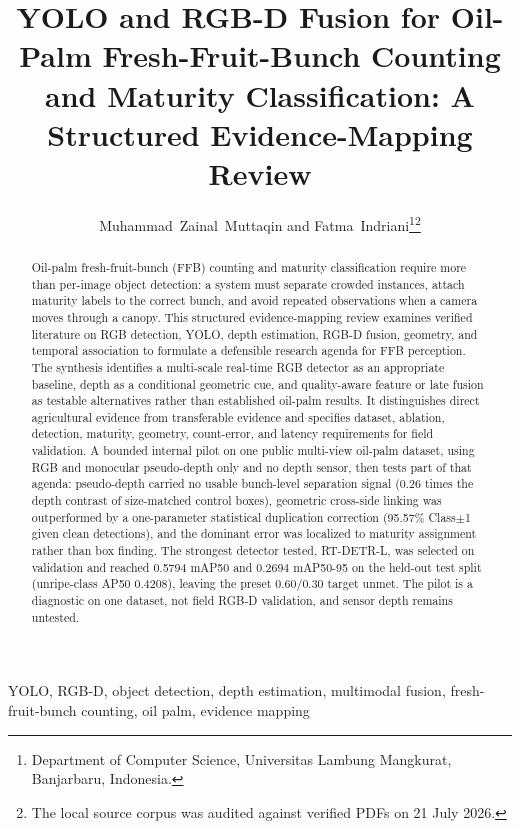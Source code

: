 \documentclass[journal]{IEEEtran}
\begin{document}
\title{YOLO and RGB-D Fusion for Oil-Palm Fresh-Fruit-Bunch Counting and Maturity Classification: A Structured Evidence-Mapping Review}
\author{Muhammad~Zainal~Muttaqin and Fatma~Indriani\thanks{Department of Computer Science, Universitas Lambung Mangkurat, Banjarbaru, Indonesia.}\thanks{The local source corpus was audited against verified PDFs on 21 July 2026.}}
\maketitle
\begin{abstract}
Oil-palm fresh-fruit-bunch (FFB) counting and maturity classification require
more than per-image object detection: a system must separate crowded instances,
attach maturity labels to the correct bunch, and avoid repeated observations
when a camera moves through a canopy. This structured evidence-mapping review
examines verified literature on RGB detection, YOLO, depth estimation, RGB-D
fusion, geometry, and temporal association to formulate a defensible research
agenda for FFB perception. The synthesis identifies a multi-scale real-time
RGB detector as an appropriate baseline, depth as a conditional geometric cue,
and quality-aware feature or late fusion as testable alternatives rather than
established oil-palm results. It distinguishes direct agricultural evidence
from transferable evidence and specifies dataset, ablation, detection, maturity,
geometry, count-error, and latency requirements for field validation.
A bounded internal pilot on one public multi-view oil-palm dataset, using RGB
and monocular pseudo-depth only and no depth sensor, then tests part of that
agenda: pseudo-depth carried no usable bunch-level separation signal (0.26 times
the depth contrast of size-matched control boxes), geometric cross-side linking
was outperformed by a one-parameter statistical duplication correction (95.57\%
Class$\pm$1 given clean detections), and the dominant error was localized to
maturity assignment rather than box finding. The strongest detector tested,
RT-DETR-L, was selected on validation and reached 0.5794 mAP50 and 0.2694
mAP50-95 on the held-out test split (unripe-class AP50 0.4208), leaving the
preset 0.60/0.30 target unmet. The pilot is a diagnostic on one dataset, not
field RGB-D validation, and sensor depth remains untested.
\end{abstract}
\begin{IEEEkeywords}YOLO, RGB-D, object detection, depth estimation, multimodal fusion, fresh-fruit-bunch counting, oil palm, evidence mapping\end{IEEEkeywords}



\end{document}
